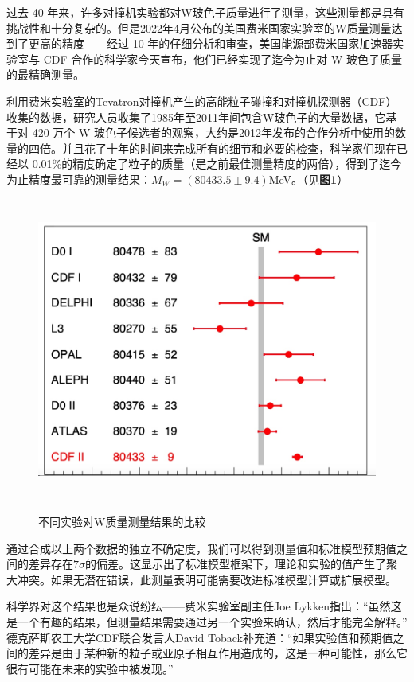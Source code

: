 过去 40 年来，许多对撞机实验都对W玻色子质量进行了测量，这些测量都是具有挑战性和十分复杂的。但是2022年4月公布的美国费米国家实验室的W质量测量达到了更高的精度——经过 10 年的仔细分析和审查，美国能源部费米国家加速器实验室与 CDF 合作的科学家今天宣布，他们已经实现了迄今为止对 W 玻色子质量的最精确测量。

利用费米实验室的Tevatron对撞机产生的高能粒子碰撞和对撞机探测器（CDF）收集的数据，研究人员收集了1985年至2011年间包含W玻色子的大量数据，它基于对 420 万个 W 玻色子候选者的观察，大约是2012年发布的合作分析中使用的数量的四倍。并且花了十年的时间来完成所有的细节和必要的检查，科学家们现在已经以 0.01\%的精度确定了粒子的质量（是之前最佳测量精度的两倍），得到了迄今为止精度最可靠的测量结果：$M_W=(80433.5\pm 9.4)$MeV。（见\textbf{图\ref{fig:1.3}}）
\begin{figure}[H]
 \centering
 \caption{不同实验对W质量测量结果的比较\cite{Wmass}}
 \includegraphics[height=10cm, width=12cm]{pictures/w-boson-comparisons.jpeg}
 \label{fig:1.3}
\end{figure}

通过合成以上两个数据的独立不确定度，我们可以得到测量值和标准模型预期值之间的差异存在$7\sigma$的偏差。这显示出了标准模型框架下，理论和实验的值产生了聚大冲突。如果无潜在错误，此测量表明可能需要改进标准模型计算或扩展模型。

科学界对这个结果也是众说纷纭——费米实验室副主任Joe Lykken指出：“虽然这是一个有趣的结果，但测量结果需要通过另一个实验来确认，然后才能完全解释。”
德克萨斯农工大学CDF联合发言人David Toback补充道：“如果实验值和预期值之间的差异是由于某种新的粒子或亚原子相互作用造成的，这是一种可能性，那么它很有可能在未来的实验中被发现。”

